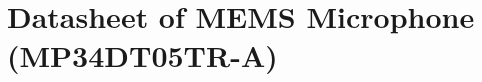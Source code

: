 \section{Datasheet of MEMS Microphone (MP34DT05TR-A)} \label{appendix_datasheet_microphone}
\enlargethispage{2.5cm}
\begin{adjustwidth}{0.23cm}{0cm} \hfuzz=7.0pt \vfuzz=19.0pt
\end{adjustwidth}
\newpage



